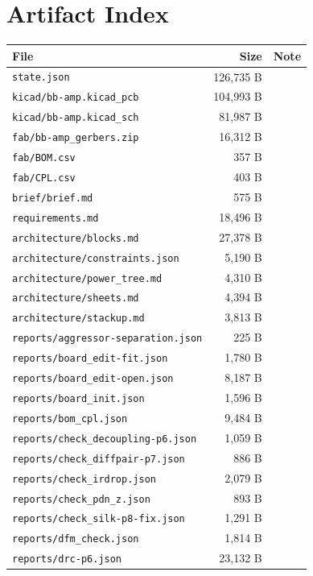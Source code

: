 \documentclass[11pt,a4paper]{article}
\begin{document}
\section{Artifact Index}
{\small
\begin{longtable}{p{9cm}rp{4cm}}
\toprule
\textbf{File} & \textbf{Size} & \textbf{Note} \\
\midrule
\endhead
\texttt{state.json} & 126,735 B &  \\
\texttt{kicad/bb-amp.kicad\_pcb} & 104,993 B &  \\
\texttt{kicad/bb-amp.kicad\_sch} & 81,987 B &  \\
\texttt{fab/bb-amp\_gerbers.zip} & 16,312 B &  \\
\texttt{fab/BOM.csv} & 357 B &  \\
\texttt{fab/CPL.csv} & 403 B &  \\
\texttt{brief/brief.md} & 575 B &  \\
\texttt{requirements.md} & 18,496 B &  \\
\texttt{architecture/blocks.md} & 27,378 B &  \\
\texttt{architecture/constraints.json} & 5,190 B &  \\
\texttt{architecture/power\_tree.md} & 4,310 B &  \\
\texttt{architecture/sheets.md} & 4,394 B &  \\
\texttt{architecture/stackup.md} & 3,813 B &  \\
\texttt{reports/aggressor-separation.json} & 225 B &  \\
\texttt{reports/board\_edit-fit.json} & 1,780 B &  \\
\texttt{reports/board\_edit-open.json} & 8,187 B &  \\
\texttt{reports/board\_init.json} & 1,596 B &  \\
\texttt{reports/bom\_cpl.json} & 9,484 B &  \\
\texttt{reports/check\_decoupling-p6.json} & 1,059 B &  \\
\texttt{reports/check\_diffpair-p7.json} & 886 B &  \\
\texttt{reports/check\_irdrop.json} & 2,079 B &  \\
\texttt{reports/check\_pdn\_z.json} & 893 B &  \\
\texttt{reports/check\_silk-p8-fix.json} & 1,291 B &  \\
\texttt{reports/dfm\_check.json} & 1,814 B &  \\
\texttt{reports/drc-p6.json} & 23,132 B &  \\

\end{longtable}}
\end{document}
